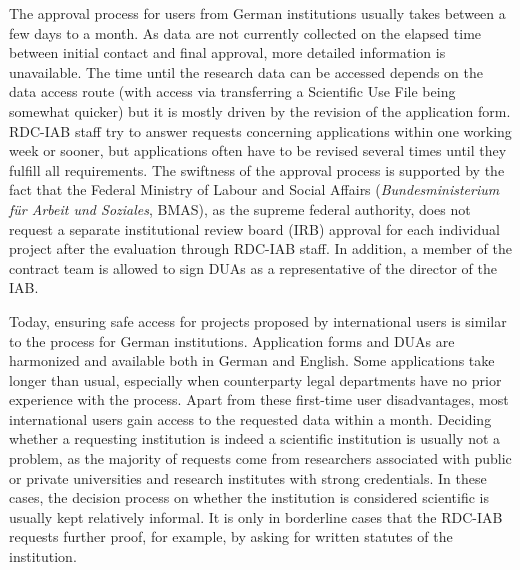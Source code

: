 The approval process for users from German institutions usually takes between a few days to a month. As data are not currently collected on the elapsed time between initial contact and final approval, more detailed information is unavailable. The time until the research data can be accessed depends on the data access route (with access via transferring a Scientific Use File being somewhat quicker) but it is mostly driven by the revision of the application form. RDC-IAB staff try to answer requests concerning applications within one working week or sooner, but applications often have to be revised several times until they fulfill all requirements. The swiftness of the approval process is supported by the fact that the Federal Ministry of Labour and Social Affairs (\emph{Bundesministerium für Arbeit und Soziales}, BMAS), as the supreme federal authority, does not request a separate institutional review board (IRB) approval for each individual project after the evaluation through RDC-IAB staff. In addition, a member of the contract team is allowed to sign DUAs as a representative of the director of the IAB.

Today, ensuring safe access for projects proposed by international users is similar to the process for German institutions. Application forms and DUAs are harmonized and available both in German and English. Some applications take longer than usual, especially when counterparty legal departments have no prior experience with the process. Apart from these first-time user disadvantages, most international users gain access to the requested data within a month. Deciding whether a requesting institution is indeed a scientific institution is usually not a problem, as the majority of requests come from researchers associated with public or private universities and research institutes with strong credentials. In these cases, the decision process on whether the institution is considered scientific is usually kept relatively informal. It is only in borderline cases that the RDC-IAB requests further proof, for example, by asking for written statutes of the institution.

